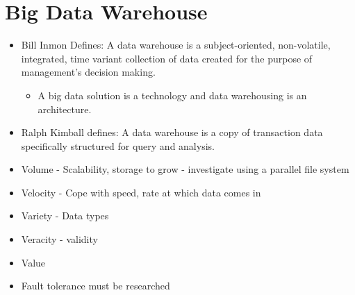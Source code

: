 \section{Big Data Warehouse}
\begin{itemize}
	\item Bill Inmon Defines: A data warehouse is a subject-oriented, non-volatile, integrated, time variant collection of data created for the purpose of management’s decision making.
	\begin{itemize}
		\item A big data solution is a technology and data warehousing is an architecture.
	\end{itemize}
	\item Ralph Kimball defines: A data warehouse is a copy of transaction data specifically structured for query and analysis.
	\item Volume - Scalability, storage to grow - investigate using a parallel file system
	\item Velocity - Cope with speed, rate at which data comes in
	\item Variety - Data types
	\item Veracity - validity
	\item Value
	\item Fault tolerance must be researched
\end{itemize}

